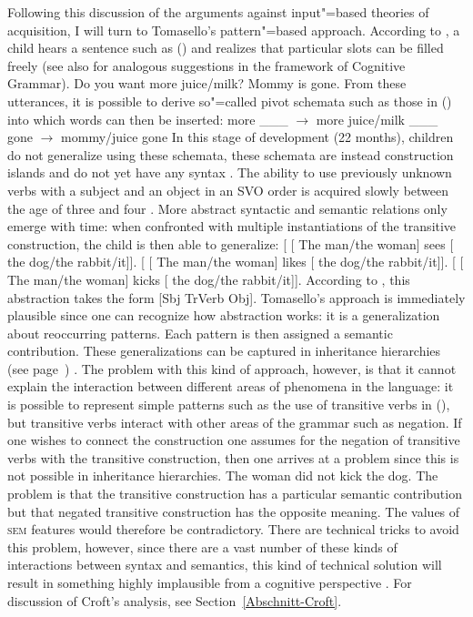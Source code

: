 Following this discussion of the arguments against input"=based theories of acquisition, I will turn to Tomasello's pattern"=based approach\indexcxgstart.
According to \citet[Section~4.2.1]{Tomasello2003a}, a child hears a sentence such as () and realizes that particular slots can
be filled freely (see also  for analogous suggestions in the framework of Cognitive Grammar).
\eal
\ex Do you want more juice/milk?
\ex Mommy is gone.
\zl
From these utterances, it is possible to derive so"=called pivot schemata such as those in () into which words
can then be inserted:
\eal
\ex more \_\_\_ $\to$ more juice/milk
\ex \_\_\_ gone $\to$ mommy/juice gone
\zl
In this stage of development (22 months), children do not generalize using these schemata, these schemata are instead construction islands
and do not yet have any syntax \citep{TADR97a}. The ability to use previously unknown verbs with a subject and an object in an SVO order
is acquired slowly between the age of three and four \citep[--129]{Tomasello2003a}.
More abstract syntactic and semantic relations only emerge with time: when confronted with multiple instantiations of the transitive construction,
the child is then able to generalize:
\eal
\label{Beispiele-fuer-Transitivkonstruktion}
\ex {}[ [ The man/the woman] sees  [ the dog/the rabbit/it]].
\ex {}[ [ The man/the woman] likes [ the dog/the rabbit/it]].
\ex {}[ [ The man/the woman] kicks [ the dog/the rabbit/it]].
\zl
According to \citet[]{Tomasello2003a}, this abstraction takes the form [Sbj TrVerb Obj]. 
Tomasello's approach is immediately plausible since one can recognize how abstraction works:
it is a generalization about reoccurring patterns. Each pattern is then assigned a semantic contribution.
These generalizations can be captured in inheritance hierarchies (see page~\pageref{Seite-Typhierarchie}) \citep[]{Croft2001a}.
The problem with this kind of approach, however, is that it cannot explain the interaction between different areas of phenomena in the
language: it is possible to represent simple patterns such as the use of transitive verbs in
(), but transitive verbs interact with other areas of the grammar such as negation. If one wishes to connect the construction one assumes for the negation
of transitive verbs with the transitive construction, then one arrives at a problem since this is not possible in
inheritance hierarchies.
\ea
The woman did not kick the dog.
\z
The problem is that the transitive construction has a particular semantic contribution but that
negated transitive construction has the opposite meaning. The values of \textsc{sem} features would
therefore be contradictory. There are technical tricks to avoid this problem, however, since there
are a vast number of these kinds of interactions between syntax and semantics, this kind of
technical solution will result in something highly implausible from a cognitive perspective
\citep{Mueller2006d,Mueller2007d,MuellerLehrbuch1,MuellerPersian,MWArgSt}. 
For discussion of Croft's analysis, see Section~\ref{Abschnitt-Croft}.

